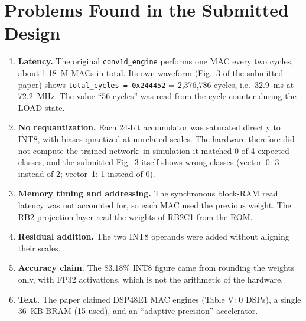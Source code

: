 \documentclass[10pt,a4paper]{article}
\begin{document}
\section{Problems Found in the Submitted Design}
\begin{enumerate}
  \item \textbf{Latency.} The original \texttt{conv1d\_engine} performs one MAC every two cycles,
  about 1.18~M MACs in total. Its own waveform (Fig.~3 of the submitted paper) shows
  \texttt{total\_cycles = 0x244452} = 2,376,786 cycles, i.e.\ 32.9~ms at 72.2~MHz. The
  value ``56 cycles'' was read from the cycle counter during the LOAD state.
  \item \textbf{No requantization.} Each 24-bit accumulator was saturated directly to INT8, with
  biases quantized at unrelated scales. The hardware therefore did not compute the trained
  network: in simulation it matched 0 of 4 expected classes, and the submitted Fig.~3 itself
  shows wrong classes (vector~0: 3 instead of 2; vector~1: 1 instead of 0).
  \item \textbf{Memory timing and addressing.} The synchronous block-RAM read latency was not
  accounted for, so each MAC used the previous weight. The RB2 projection layer read the
  weights of RB2C1 from the ROM.
  \item \textbf{Residual addition.} The two INT8 operands were added without aligning their scales.
  \item \textbf{Accuracy claim.} The 83.18\% INT8 figure came from rounding the weights only, with
  FP32 activations, which is not the arithmetic of the hardware.
  \item \textbf{Text.} The paper claimed DSP48E1 MAC engines (Table V: 0 DSPs), a single 36~KB BRAM
  (15 used), and an ``adaptive-precision'' accelerator.
\end{enumerate}
\end{document}
